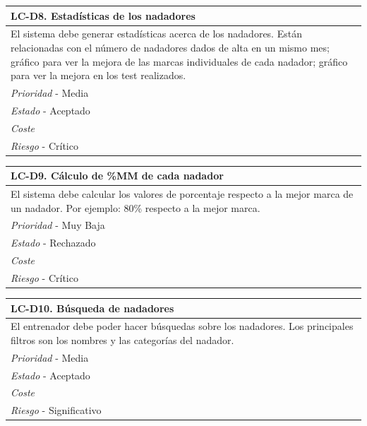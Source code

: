 	\begin{center}
		\begin{tabularx}{15cm}{|X|}
			\hline 
				\bf{LC-D8. Estadísticas de los nadadores}\\
			\hline
				El sistema debe generar estadísticas acerca de los nadadores. Están relacionadas con el número de nadadores dados de alta en un mismo mes; gráfico para ver la mejora de las marcas individuales de cada nadador; gráfico para ver la mejora en los test realizados.\\
			\hline
				{\it Prioridad} - Media\\
			\hline
				{\it Estado} - Aceptado\\
			\hline
				{\it Coste}\\
			\hline
				{\it Riesgo} - Crítico\\
			\hline
		\end{tabularx}
	\end{center}
	
	\begin{center}
		\begin{tabularx}{15cm}{|X|}
			\hline 
				\bf{LC-D9. Cálculo de \%MM de cada nadador}\\
			\hline
				El sistema debe calcular los valores de porcentaje respecto a la mejor marca de un nadador. Por ejemplo: 80\% respecto a la mejor marca.\\
			\hline
				{\it Prioridad} - Muy Baja\\
			\hline
				{\it Estado} - Rechazado\\
			\hline
				{\it Coste}\\
			\hline
				{\it Riesgo} - Crítico\\
			\hline
		\end{tabularx}
	\end{center}
	
	\begin{center}
		\begin{tabularx}{15cm}{|X|}
			\hline 
				\bf{LC-D10. Búsqueda de nadadores}\\
			\hline
				El entrenador debe poder hacer búsquedas sobre los nadadores. Los principales filtros son los nombres y las categorías del nadador.\\
			\hline
				{\it Prioridad} - Media\\
			\hline
				{\it Estado} - Aceptado\\
			\hline
				{\it Coste}\\
			\hline
				{\it Riesgo} - Significativo\\
			\hline
		\end{tabularx}
	\end{center}
	
